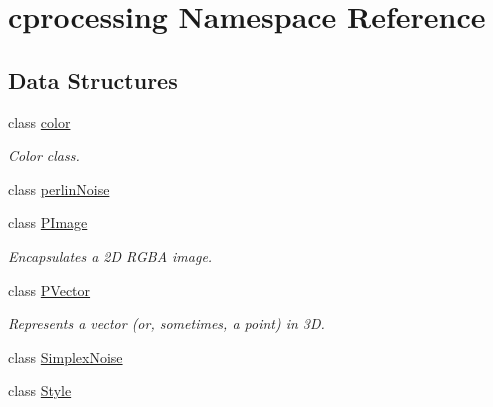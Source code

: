 \hypertarget{namespacecprocessing}{\section{cprocessing \-Namespace \-Reference}
\label{namespacecprocessing}
}
\subsection*{\-Data \-Structures}
\begin{DoxyCompactItemize}
\item 
class \hyperlink{classcprocessing_1_1color}{color}
\begin{DoxyCompactList}\small\item\em \-Color class. \end{DoxyCompactList}\item 
class \hyperlink{classcprocessing_1_1perlinNoise}{perlin\-Noise}
\item 
class \hyperlink{classcprocessing_1_1PImage}{\-P\-Image}
\begin{DoxyCompactList}\small\item\em \-Encapsulates a 2\-D \-R\-G\-B\-A image. \end{DoxyCompactList}\item 
class \hyperlink{classcprocessing_1_1PVector}{\-P\-Vector}
\begin{DoxyCompactList}\small\item\em \-Represents a vector (or, sometimes, a point) in 3\-D. \end{DoxyCompactList}\item 
class \hyperlink{classcprocessing_1_1SimplexNoise}{\-Simplex\-Noise}
\item 
class \hyperlink{classcprocessing_1_1Style}{\-Style}
\end{DoxyCompactItemize}
